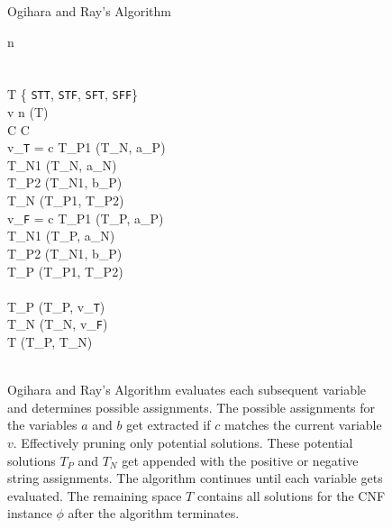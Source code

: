 
\begin{figure}[htbp]
\begin{center}

	\begin{pseudocode}{Ogihara and Ray's Algorithm}{\phi}
	
	n  \phi \\
	\\
	\\
	T \GETS \{ \texttt{STT}, \texttt{STF}, \texttt{SFT},  \texttt{SFF}\} \\
	
	\FOR v   n \DO
		\BEGIN
		[T_P, T_N] \GETS {}(T)\\
	
		\FOREACH {} C  \phi \DO
			\BEGIN
				[a, b, c] \GETS C\\
				\IF v_{\texttt{T}} = c  \THEN
					\BEGIN
						T_{P1} \GETS {}(T_N, a_P)\\
						T_{N1} \GETS {}(T_N, a_N)\\				
						T_{P2} \GETS {}(T_{N1}, b_P)\\
						T_{N} \GETS {}(T_{P1}, T_{P2})
					\END \\  
				\IF v_{\texttt{F}} = c \THEN
					\BEGIN
						T_{P1} \GETS {}(T_P, a_P)\\
						T_{N1} \GETS {}(T_P, a_N)\\				
						T_{P2} \GETS {}(T_{N1}, b_P)\\
						T_{P} \GETS {}(T_{P1}, T_{P2})
					\END\\
			\END\\
			T_P \GETS {}(T_P, v_{\texttt{T}})\\
			T_N \GETS {}(T_N, v_{\texttt{F}})\\
			T \GETS {}(T_P, T_N)\\
		\END\\
	\end{pseudocode}

\caption{{\sc Ogihara and Ray's Algorithm} evaluates each subsequent variable and determines possible assignments.  The possible assignments for the variables $a$ and $b$ get extracted if $c$ matches the current variable $v$.  Effectively pruning only potential solutions.  These potential solutions $T_P$ and $T_N$ get appended with the positive or negative string assignments.  The algorithm continues until each variable gets evaluated.  The remaining space $T$ contains all solutions for the CNF instance $\phi$ after the algorithm terminates.}
\label{ogiharaRayAlgorithm}
\end{center}
\end{figure}

